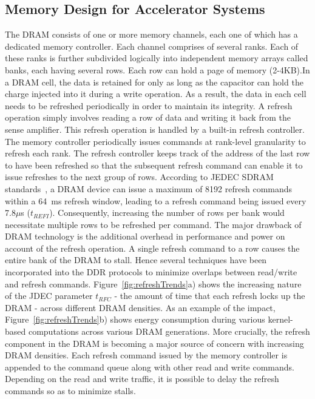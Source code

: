 \subsection{Memory Design for Accelerator Systems}

The DRAM consists of one or more memory channels, each one of which has a dedicated memory controller. Each channel comprises of several ranks. Each of these ranks is further subdivided logically into independent memory arrays called banks, each having several rows. Each row can hold a page of memory (2-4KB).In a DRAM cell, the data is retained for only as long as the capacitor can hold the charge injected into it during a write operation.  As a result, the data in each cell needs to be refreshed periodically in order to maintain its integrity. A refresh operation simply involves reading a row of data and writing it back from the sense amplifier. This refresh operation is handled by a built-in refresh controller. The memory controller periodically issues commands at rank-level granularity to refresh each rank. The refresh controller keeps track of the address of the last row to have been refreshed so that the subsequent refresh command can enable it to issue refreshes to the next group of rows.
According to JEDEC SDRAM standards~\cite{jedec-sdram-standards}, a DRAM device can issue a maximum of 8192 refresh commands within a 64~ms refresh window, leading to a refresh command being issued every 7.8$\mu$s ($t_{REFI}$). Consequently, increasing the number of rows per bank would necessitate multiple rows to be refreshed per command. The major drawback of DRAM technology is the additional overhead in performance and power on account of the refresh operation. A single refresh command to a row causes the entire bank of the DRAM to stall. Hence several techniques have been incorporated into the DDR protocols to minimize overlaps between read/write and refresh commands. Figure~\ref{fig:refreshTrends}a) shows the increasing nature of the JDEC parameter $t_{RFC}$ - the amount of time that each refresh locks up the DRAM - across different DRAM densities. As an example of the impact, Figure~\ref{fig:refreshTrends}b) shows energy consumption during various kernel-based computations across various DRAM generations. More crucially, the refresh component in the DRAM is becoming a major source of concern with increasing DRAM densities. Each refresh command issued by the memory controller is appended to the command queue along with other read and write commands. Depending on the read and write traffic, it is possible to delay the refresh commands so as to minimize stalls. %
